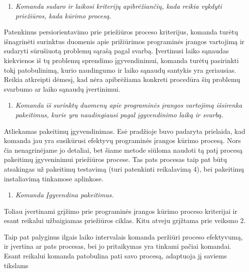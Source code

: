 \documentclass[12pt, a4paper, lithuanian, final]{article}
\begin{document}
\begin{enumerate}
	\setcounter{enumi}{\thereqList}
	\item \textit{Komanda sudaro ir laikosi kriterijų apibrėžiančių, kada reikia vykdyti priežiūros, kada kūrimo procesą.}
	\setcounter{reqList}{\theenumi}
\end{enumerate}


Patenkinus persiorientavimo prie priežiūros proceso kriterijus, komanda turėtų išnagrinėti surinktus duomenis apie prižiūrimos programinės įrangos vartojimą ir sudaryti sūrušiuotą problemų sąrašą pagal svarbą.
Įvertinusi laiko sąnaudas kiekvienos iš tų problemų sprendimo įgyvendinimui, komanda turėtų pasirinkti tokį patobulinimą, kurio naudingumo ir laiko sąnaudų santykis yra geriausias.
Reikia atkreipti dėmesį, kad nėra apibrėžiama konkreti procedūra šių problemų svarbumo ar laiko sąnaudų įvertinimui.

\begin{enumerate}
	\setcounter{enumi}{\thereqList}
	\item \textit{Komanda iš surinktų duomenų apie programinės įrangos vartojimą išsirenka pakeitimus, kurie yra naudingiausi pagal įgyvendinimo laiką ir svarbą.}
	\setcounter{reqList}{\theenumi}
\end{enumerate}

Atliekamas pakeitimų įgyvendinimas.
Esė pradžioje buvo padaryta prielaida, kad komanda jau yra susikūrusi efektyvų programinės įrangos kūrimo procesą.
Nors čia nenagrinėjame jo detaliai, bet šiame metode siūloma naudoti tą patį procesą pakeitimų įgyveninimui priežiūros procese.
Tas pats procesas taip pat būtų atsakingas už pakeitimų testavimą (turi patenkinti reikalavimą 4), bei pakeitimų instaliavimą tinkamose aplinkose.

\begin{enumerate}
	\setcounter{enumi}{\thereqList}
	\item \textit{Komanda Įgyvendina pakeitimus.}
	\setcounter{reqList}{\theenumi}
\end{enumerate}

Toliau įvertinami grįžimo prie programinės įrangos kūrimo proceso kriterijai ir esant reikalui užbaigiamas priežiūros ciklas.
Kitu atveju grįžtama prie veiksmo 2.

Taip pat palyginus ilgais laiko intervalais komanda peržiūri proceso efektyvumą, ir įvertina ar pats procesas, bei jo pritaikymas yra tinkami pačiai komandai.
Esant reikalui komanda patobulina pati savo procesą, adaptuoja jį saviems tikslams
\end{document}
